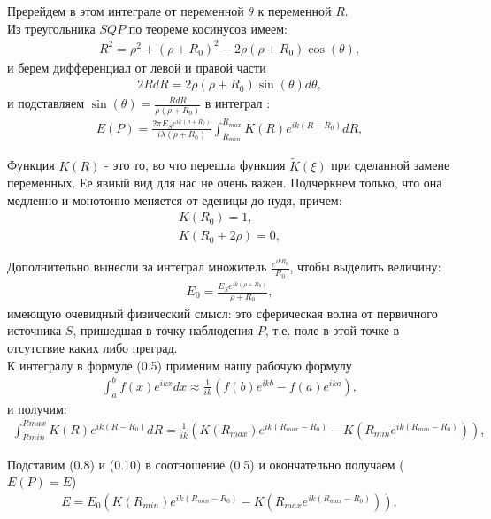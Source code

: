 \documentclass[__main__.tex]{subfiles}
\begin{document}
Пререйдем в этом интеграле от переменной $\theta$ к переменной $R$.\\
Из треугольника $SQP$ по теореме косинусов имеем:
\begin{gather}
R^2 = \rho^2 + (\rho + R_0)^2 - 2\rho(\rho + R_0)\cos(\theta) ,
\end{gather}
и берем дифференциал от левой и правой части
\begin{gather}
2RdR = 2\rho(\rho + R_0)\sin(\theta)d\theta ,
\end{gather}
и подставляем $\sin (\theta) = \frac{RdR}{\rho(\rho + R_0)}$ в интеграл :
\begin{gather}
E(P) = \frac{2\pi E_S e^{ik(\rho + R_0)}}{i\lambda(\rho + R_0)} \int_{R_{min}}^{R_{max}} K(R)e^{ik(R-R_0)}dR ,
\end{gather}

Функция $K(R)$ - это то, во что перешла функция $\tilde{K}(\xi)$ при сделанной замене переменных. Ее явный вид для нас не очень важен. Подчеркнем только, что она медленно и монотонно меняется от еденицы до нудя, причем:
\begin{gather}
K(R_0) = 1 , \\
K(R_0+2\rho) = 0 ,
\end{gather}

Дополнительно вынесли за интеграл множитель $\frac{e^{ikR_0}}{R_0}$, чтобы выделить величину:
\begin{gather}
E_0 = \frac{E_S e^{ik(\rho + R_0)}}{\rho + R_0} ,
\end{gather}
имеющую очевидный физический смысл: это сферическая волна от первичного источника $S$, пришедшая в точку наблюдения $P$, т.е. поле в этой точке в отсутствие каких либо преград.\\

К интегралу в формуле (0.5)
применим нашу рабочую формулу
\begin{gather}
\int_{a}^{b} f(x)e^{ikx}dx \approx \frac{1}{ik} (f(b)e^{ikb} - f(a)e^{ika}) ,
\end{gather}
и получим:
\begin{gather}
\int_{R{min}}^{R{max}} K(R)e^{ik(R-R_0)}dR = \frac{1}{ik}(K(R_{max})e^{ik(R_{max} - R_0)}-K(R_{min}e^{ik(R_{min} - R_0)})) ,
\end{gather}

Подставим (0.8) и (0.10)
в соотношение (0.5)
и окончательно получаем ($E(P)=E$)\\
\begin{gather}
E = E_0 (K(R_{min})e^{ik(R_{min} - R_0)}-K(R_{max}e^{ik(R_{max} - R_0)})) ,
\end{gather}
\end{document}
